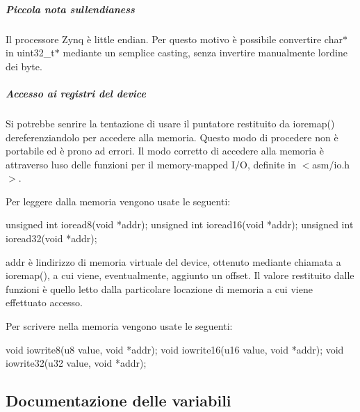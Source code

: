 \subparagraph*{Piccola nota sull\textquotesingle{}endianess}

Il processore Zynq è little endian. Per questo motivo è possibile convertire char$\ast$ in uint32\+\_\+t$\ast$ mediante un semplice casting, senza invertire manualmente l\textquotesingle{}ordine dei byte.

\subparagraph*{Accesso ai registri del device}

Si potrebbe senrire la tentazione di usare il puntatore restituito da ioremap() dereferenziandolo per accedere alla memoria. Questo modo di procedere non è portabile ed è prono ad errori. Il modo corretto di accedere alla memoria è attraverso l\textquotesingle{}uso delle funzioni per il memory-\/mapped I/O, definite in $<$asm/io.\+h$>$.

Per leggere dalla memoria vengono usate le seguenti\+:


\begin{DoxyCode}
\textcolor{keywordtype}{unsigned} \textcolor{keywordtype}{int} ioread8(\textcolor{keywordtype}{void} *addr);
\textcolor{keywordtype}{unsigned} \textcolor{keywordtype}{int} ioread16(\textcolor{keywordtype}{void} *addr);
\textcolor{keywordtype}{unsigned} \textcolor{keywordtype}{int} ioread32(\textcolor{keywordtype}{void} *addr);
\end{DoxyCode}


addr è l\textquotesingle{}indirizzo di memoria virtuale del device, ottenuto mediante chiamata a ioremap(), a cui viene, eventualmente, aggiunto un offset. Il valore restituito dalle funzioni è quello letto dalla particolare locazione di memoria a cui viene effettuato accesso.

Per scrivere nella memoria vengono usate le seguenti\+:


\begin{DoxyCode}
\textcolor{keywordtype}{void} iowrite8(u8 value, \textcolor{keywordtype}{void} *addr);
\textcolor{keywordtype}{void} iowrite16(u16 value, \textcolor{keywordtype}{void} *addr);
\textcolor{keywordtype}{void} iowrite32(u32 value, \textcolor{keywordtype}{void} *addr);
\end{DoxyCode}


\subsection{Documentazione delle variabili}
\mbox{\label{group___linux-_driver_ga1deed297d5c8afeb9703965d37d3be5b}} 
